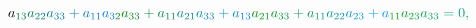 \documentclass[12pt]{article}
\begin{document}
\begin{displaymath}
{a} _ { \mathcolor[RGB]{0,120,60}{1} \mathcolor[RGB]{0,120,75}{3} } \mathcolor[RGB]{0,120,90}{a} _ { \mathcolor[RGB]{0,120,105}{2} \mathcolor[RGB]{0,120,120}{2} } \mathcolor[RGB]{0,120,135}{a} _ { \mathcolor[RGB]{0,120,150}{3} \mathcolor[RGB]{0,120,165}{3} } \mathcolor[RGB]{0,120,180}{+} \mathcolor[RGB]{0,120,195}{a} _ { \mathcolor[RGB]{0,120,210}{1} \mathcolor[RGB]{0,120,225}{1} } \mathcolor[RGB]{0,120,240}{a} _ { \mathcolor[RGB]{0,120,255}{3} \mathcolor[RGB]{0,135,0}{2} } \mathcolor[RGB]{0,135,15}{a} _ { \mathcolor[RGB]{0,135,30}{3} \mathcolor[RGB]{0,135,45}{3} } \mathcolor[RGB]{0,135,60}{+} \mathcolor[RGB]{0,135,75}{a} _ { \mathcolor[RGB]{0,135,90}{1} \mathcolor[RGB]{0,135,105}{1} } \mathcolor[RGB]{0,135,120}{a} _ { \mathcolor[RGB]{0,135,135}{2} \mathcolor[RGB]{0,135,150}{1} } \mathcolor[RGB]{0,135,165}{a} _ { \mathcolor[RGB]{0,135,180}{3} \mathcolor[RGB]{0,135,195}{3} } \mathcolor[RGB]{0,135,210}{+} \mathcolor[RGB]{0,135,225}{a} _ { \mathcolor[RGB]{0,135,240}{1} \mathcolor[RGB]{0,135,255}{3} } \mathcolor[RGB]{0,150,0}{a} _ { \mathcolor[RGB]{0,150,15}{2} \mathcolor[RGB]{0,150,30}{1} } \mathcolor[RGB]{0,150,45}{a} _ { \mathcolor[RGB]{0,150,60}{3} \mathcolor[RGB]{0,150,75}{3} } \mathcolor[RGB]{0,150,90}{+} \mathcolor[RGB]{0,150,105}{a} _ { \mathcolor[RGB]{0,150,120}{1} \mathcolor[RGB]{0,150,135}{1} } \mathcolor[RGB]{0,150,150}{a} _ { \mathcolor[RGB]{0,150,165}{2} \mathcolor[RGB]{0,150,180}{2} } \mathcolor[RGB]{0,150,195}{a} _ { \mathcolor[RGB]{0,150,210}{2} \mathcolor[RGB]{0,150,225}{3} } \mathcolor[RGB]{0,150,240}{+} \mathcolor[RGB]{0,150,255}{a} _ { \mathcolor[RGB]{0,165,0}{1} \mathcolor[RGB]{0,165,15}{1} } \mathcolor[RGB]{0,165,30}{a} _ { \mathcolor[RGB]{0,165,45}{2} \mathcolor[RGB]{0,165,60}{3} } \mathcolor[RGB]{0,165,75}{a} _ { \mathcolor[RGB]{0,165,90}{3} \mathcolor[RGB]{0,165,105}{3} } \mathcolor[RGB]{0,165,120}{=} \mathcolor[RGB]{0,165,135}{0} \mathcolor[RGB]{0,165,150}{,} \mathcolor[RGB]{0,165,165}{\,
}
\end{displaymath}
\end{document}
